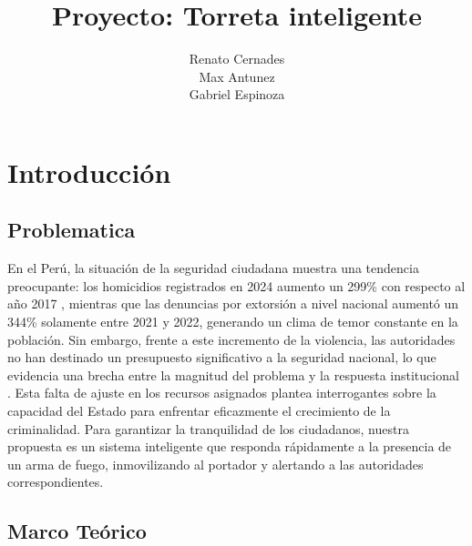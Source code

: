 \documentclass{article}
\title{Proyecto: Torreta inteligente}
\author{Renato Cernades \\ 
        Max Antunez  \\
        Gabriel Espinoza
        }
\begin{document}
\maketitle

\section{Introducción}

\subsection{Problematica}

En el Perú, la situación de la seguridad ciudadana muestra una tendencia preocupante: los homicidios registrados en 2024 aumento un 299\% con respecto al año 2017 \cite{statista_peru_homicidios}, mientras que las denuncias por extorsión a nivel nacional aumentó un 344\% solamente entre 2021 y 2022, generando un clima de temor constante en la población. Sin embargo, frente a este incremento de la violencia, las autoridades no han destinado un presupuesto significativo a la seguridad nacional, lo que evidencia una brecha entre la magnitud del problema y la respuesta institucional \cite{lacamara_seguridad_2025}. Esta falta de ajuste en los recursos asignados plantea interrogantes sobre la capacidad del Estado para enfrentar eficazmente el crecimiento de la criminalidad. Para garantizar la tranquilidad de los ciudadanos, nuestra propuesta es un sistema inteligente que responda rápidamente a la presencia de un arma de fuego, inmovilizando al portador y alertando a las autoridades correspondientes.


\subsection{Marco Teórico}
\end{document}
